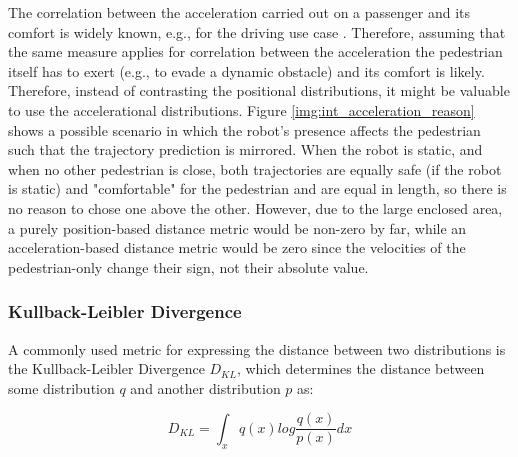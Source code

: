 The correlation between the acceleration carried out on a passenger and its comfort is widely known, e.g., for the driving use case \cite{Hoberock1976}. Therefore, assuming that the same measure applies for correlation between the acceleration the pedestrian itself has to exert (e.g., to evade a dynamic obstacle) and its comfort is likely. Therefore, instead of contrasting the positional distributions, it might be valuable to use the accelerational distributions. Figure \ref{img:int_acceleration_reason} shows a possible scenario in which the robot's presence affects the pedestrian such that the trajectory prediction is mirrored. When the robot is static, and when no other pedestrian is close, both trajectories are equally safe (if the robot is static)  and "comfortable" for the pedestrian and are equal in length, so there is no reason to chose one above the other. However, due to the large enclosed area, a purely position-based distance metric would be non-zero by far, while an acceleration-based distance metric would be zero since the velocities of the pedestrian-only change their sign, not their absolute value.

\subsubsection{Kullback-Leibler Divergence}
A commonly used metric for expressing the distance between two distributions is the Kullback-Leibler Divergence $D_{KL}$, which determines the distance between  some distribution $q$ and another distribution $p$ as:

\begin{equation}
D_{KL} = \int_x q(x) log \frac{q(x)}{p(x)} dx    
\end{equation}

